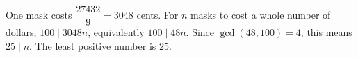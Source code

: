 One mask costs $\dfrac{27432}{9}=3048$ cents. For $n$ masks to cost a whole number of dollars, $100\mid3048n$, equivalently $100\mid48n$. Since $\gcd(48,100)=4$, this means $25\mid n$. The least positive number is $\boxed{25}$.
